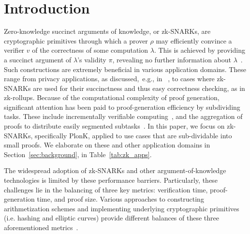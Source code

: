 \documentclass[sigconf]{acmart}
\begin{document}



\maketitle

\section{Introduction}
\label{sec:intro}
Zero-knowledge succinct arguments of knowledge, or zk-SNARKs, are cryptographic primitives through which a prover $\rho$ may efficiently convince a verifier $v$ of the correctness of some computation $\lambda$. This is achieved by providing a succinct argument of $\lambda$'s validity $\pi$, revealing no further information about $\lambda$~\cite{ZK88}. Such constructions are extremely beneficial in various application domains.  These range from privacy applications, as discussed,\, e.g., in ~\cite{ZcashWhitepaper}, to cases where zk-SNARKs are used
for their succinctness and thus easy correctness checking, as in zk-rollups.  Because of the computational complexity of proof generation, significant attention has been paid to proof-generation efficiency by subdividing tasks.  These include incrementally verifiable computing~\cite{Mina,ZKfolding}, and the aggregation of proofs to distribute easily segmented subtasks~\cite{ZKfolding,rollupReview23}. In this paper, we focus on zk-SNARKs, specifically PlonK\cite{Gabizon2019PlonKPO}, applied to use cases that are sub-dividable into small proofs. We elaborate on these and other application domains in Section~\ref{sec:background}, in Table~\ref{tab:zk_apps}. 

The widespread adoption of zk-SNARKs and other argument-of-knowledge technologies is limited by these performance barriers. Particularly, these challenges lie in the balancing of three key metrics: verification time, proof-generation time, and proof size. Various approaches to constructing arithmetization schemes and implementing underlying cryptographic primitives (i.e. hashing and elliptic curves) provide different balances of these three aforementioned metrics~\cite{Thaler23}. 
\end{document}
